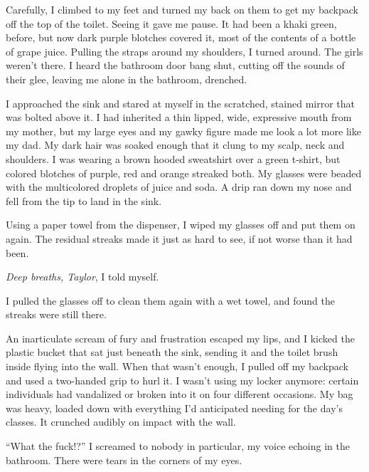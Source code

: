 Carefully, I climbed to my feet and turned my back on them to get my backpack off the top of the toilet.  Seeing it gave me pause.  It had been a khaki green, before, but now dark purple blotches covered it, most of the contents of a bottle of grape juice.  Pulling the straps around my shoulders, I turned around.  The girls weren't there.  I heard the bathroom door bang shut, cutting off the sounds of their glee, leaving me alone in the bathroom, drenched.



I approached the sink and stared at myself in the scratched, stained mirror that was bolted above it.  I had inherited a thin lipped, wide, expressive mouth from my mother, but my large eyes and my gawky figure made me look a lot more like my dad.  My dark hair was soaked enough that it clung to my scalp, neck and shoulders.  I was wearing a brown hooded sweatshirt over a green t-shirt, but colored blotches of purple, red and orange streaked both.  My glasses were beaded with the multicolored droplets of juice and soda.  A drip ran down my nose and fell from the tip to land in the sink.



Using a paper towel from the dispenser, I wiped my glasses off and put them on again.  The residual streaks made it just as hard to see, if not worse than it had been.



\emph{Deep breaths, Taylor}, I told myself.



I pulled the glasses off to clean them again with a wet towel, and found the streaks were still there.



An inarticulate scream of fury and frustration escaped my lips, and I kicked the plastic bucket that sat just beneath the sink, sending it and the toilet brush inside flying into the wall.  When that wasn't enough, I pulled off my backpack and used a two-handed grip to hurl it.  I wasn't using my locker anymore: certain individuals had vandalized or broken into it on four different occasions.  My bag was heavy, loaded down with everything I'd anticipated needing for the day's classes.  It crunched audibly on impact with the wall.



``What the fuck!?'' I screamed to nobody in particular, my voice echoing in the bathroom.  There were tears in the corners of my eyes.




